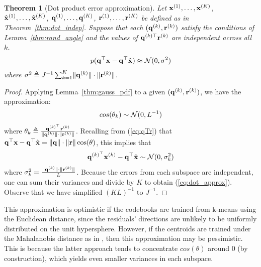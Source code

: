 \documentclass[]{article}
\newtheorem{theorem}{Theorem}[section]
\begin{document}

\begin{theorem}[Dot product error approximation] \label{thm:dot_approx}
Let $\mathbf{x}^{(1)},\ldots,\mathbf{x}^{(K)}$, \\ $\hat{\mathbf{x}}^{(1)},\ldots,\hat{\mathbf{x}}^{(K)}$, $\mathbf{q}^{(1)},\ldots,\mathbf{q}^{(K)}$, $\mathbf{r}^{(1)},\ldots,\mathbf{r}^{(K)}$ be defined as in Theorem~\ref{thm:dot_indep}. Suppose that each $(\mathbf{q}^{(k)}, \mathbf{r}^{(k)})$ satisfy the conditions of Lemma~\ref{thm:rand_angle} and the values of $\mathbf{q}^{(k)\top} \mathbf{r}^{(k)}$ are independent across all $k$. %
\begin{align} \label{eq:dot_approx}
    p(\mathbf{q}^\top \mathbf{x} - \mathbf{q}^\top \hat{\mathbf{x}}) \approx \operatorname{\mathcal{N}}(0, \sigma^2)
\end{align}
where $\sigma^2 \triangleq J^{-1} \sum_{k=1}^K \lVert\mathbf{q}^{(k)} \rVert \cdot \lVert\mathbf{r}^{(k)} \rVert$.
\end{theorem}

\begin{proof}
Applying Lemma~\ref{thm:gauss_pdf} to a given $(\mathbf{q}^{(k)}, \mathbf{r}^{(k)})$, we have the approximation:
\begin{align}
    cos(\theta_k) \sim \operatorname{\mathcal{N}}(0, L^{-1})
\end{align}
where $\theta_k \triangleq \frac{ \mathbf{q}^{(k)^\top}\mathbf{r}^{(k)} }{ \lVert\mathbf{q}^{(k)}\rVert \cdot \lVert\mathbf{r}^{(k)}\rVert }$. Recalling from (\ref{eq:qTr}) that $\mathbf{q}^\top \mathbf{x} - \mathbf{q}^\top \hat{\mathbf{x}} = \lVert\mathbf{q}\rVert \cdot \lVert\mathbf{r}\rVert \cos(\theta)$, this implies that
\begin{align}
    \mathbf{q}^{(k)^\top} \mathbf{x}^{(k)} - \mathbf{q}^\top \hat{\mathbf{x}} \sim \operatorname{\mathcal{N}}(0, \sigma_k^2)
\end{align}
where $\sigma_k^2 = \frac{ \lVert\mathbf{q}^{(k)}\rVert \cdot \lVert\mathbf{r}^{(k)}\rVert }{ L }$.
Because the errors from each subspace are independent, one can sum their variances and divide by $K$ to obtain (\ref{eq:dot_approx}). Observe that we have simplified $(KL)^{-1}$ to $J^{-1}$.
\end{proof}

This approximation is optimistic if the codebooks are trained from k-means using the Euclidean distance, since the residuals' directions are unlikely to be uniformly distributed on the unit hypersphere. However, if the centroids are trained under the Mahalanobis distance as in \cite{googleMips, pairQ}, then this approximation may be pessimistic. This is because the latter approach tends to concentrate $cos(\theta)$ around $0$ (by construction), which yields even smaller variances in each subspace.
\end{document}
